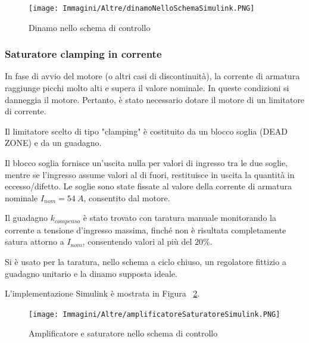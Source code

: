 \documentclass[a4paper,12pt]{article}
\begin{document}
\begin{figure}[h!]
\centering
    \texttt{[image: Immagini/Altre/dinamoNelloSchemaSimulink.PNG]}
    \caption{Dinamo nello schema di controllo}
    \label{fig:simulink_controllo_dinamo}
\end{figure}


\vspace{0.5cm}

\subsubsection{Saturatore clamping in corrente}

In fase di avvio del motore (o altri casi di discontinuità), la corrente di armatura raggiunge picchi molto alti e supera il valore nominale. In queste condizioni si danneggia il motore. Pertanto, è stato necessario dotare il motore di un limitatore di corrente.

\vspace{0.3cm}

Il limitatore scelto di tipo "clamping" è costituito da un blocco soglia (DEAD ZONE) e da un guadagno. 

Il blocco soglia fornisce un'uscita nulla per valori di ingresso tra le due soglie, mentre se l’ingresso assume valori al di fuori, restituisce in uscita la quantità in eccesso/difetto.
Le soglie sono state fissate al valore della corrente di armatura nominale $I_{nom} = 54~A$, consentito dal motore.

Il guadagno $k_{compenso}$ è stato trovato con taratura manuale monitorando la corrente a tensione d'ingresso massima, finché non è risultata completamente satura attorno a $I_{nom}$, consentendo valori al più del $20\%$. 

Si è usato per la taratura, nello schema a ciclo chiuso, un regolatore fittizio a guadagno unitario e la dinamo supposta ideale.

\vspace{0.5cm}

L'implementazione Simulink è mostrata in Figura ~\ref{fig:simulink_controllo_ampl_sat}.

\vspace{0.5cm}

\begin{figure}[h!]
\centering
    \texttt{[image: Immagini/Altre/amplificatoreSaturatoreSimulink.PNG]}
    \caption{Amplificatore e saturatore nello schema di controllo}
    \label{fig:simulink_controllo_ampl_sat}
\end{figure}
\end{document}
